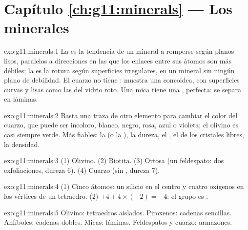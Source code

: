 \section*{Capítulo \ref{ch:g11:minerals} --- Los minerales}

\begin{solution}{exo:g11:minerals:1}
La  es la tendencia de un mineral a romperse según planos lisos,
paralelos a direcciones en las que los enlaces entre sus átomos son más
débiles; la  es la rotura según superficies irregulares, en un
mineral sin ningún plano de debilidad. El cuarzo no tiene :
muestra una  concoidea, con superficies curvas y lisas como las del
vidrio roto. Una mica tiene una , perfecta: se separa en láminas.
\end{solution}

\begin{solution}{exo:g11:minerals:2}
Basta una traza de otro elemento para cambiar el color del cuarzo, que puede
ser incoloro, blanco, negro, rosa, azul o violeta; el olivino es casi siempre
verde. Más fiables: la  (o la ), la dureza, el , el
 de los cristales libres, la densidad.
\end{solution}

\begin{solution}{exo:g11:minerals:3}
(1) Olivino. (2) Biotita. (3) Ortosa (un feldespato: dos exfoliaciones,
dureza 6). (4) Cuarzo (sin , dureza 7).
\end{solution}

\begin{solution}{exo:g11:minerals:4}
(1) Cinco átomos: un silicio en el centro y cuatro oxígenos en los vértices de
un tetraedro. (2) $+4 + 4 \times (-2) = -4$: el grupo es .
\end{solution}

\begin{solution}{exo:g11:minerals:5}
Olivino: tetraedros aislados. Piroxenos: cadenas sencillas. Anfíboles:
cadenas dobles. Micas: láminas. Feldespatos y cuarzo: armazones.
\end{solution}

